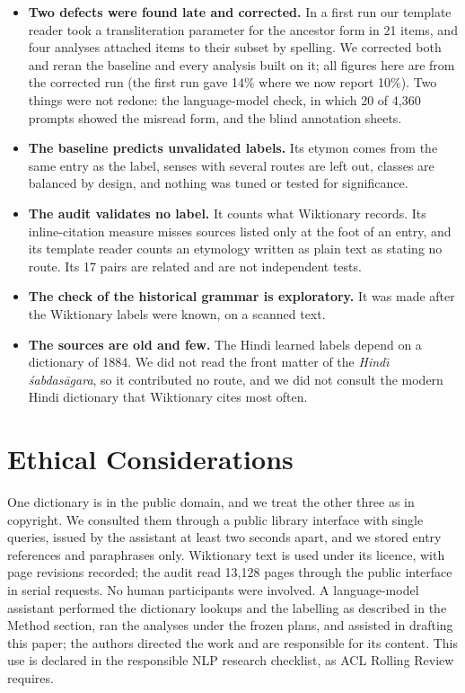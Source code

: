 \documentclass[11pt]{article}
\begin{document}
\begin{itemize}
\item \textbf{Two defects were found late and corrected.} In a first run our template reader took a transliteration parameter for the ancestor form in 21 items, and four analyses attached items to their subset by spelling. We corrected both and reran the baseline and every analysis built on it; all figures here are from the corrected run (the first run gave 14\% where we now report 10\%). Two things were not redone: the language-model check, in which 20 of 4,360 prompts showed the misread form, and the blind annotation sheets.
\item \textbf{The baseline predicts unvalidated labels.} Its etymon comes from the same entry as the label, senses with several routes are left out, classes are balanced by design, and nothing was tuned or tested for significance.
\item \textbf{The audit validates no label.} It counts what Wiktionary records. Its inline-citation measure misses sources listed only at the foot of an entry, and its template reader counts an etymology written as plain text as stating no route. Its 17 pairs are related and are not independent tests.
\item \textbf{The check of the historical grammar is exploratory.} It was made after the Wiktionary labels were known, on a scanned text.
\item \textbf{The sources are old and few.} The Hindi learned labels depend on a dictionary of 1884. We did not read the front matter of the \textit{Hind\=\i{} \'sabdas\=agara}, so it contributed no route, and we did not consult the modern Hindi dictionary that Wiktionary cites most often.
\end{itemize}

\section*{Ethical Considerations}

One dictionary is in the public domain, and we treat the other three as in copyright. We consulted them through a public library interface with single queries, issued by the assistant at least two seconds apart, and we stored entry references and paraphrases only. Wiktionary text is used under its licence, with page revisions recorded; the audit read 13,128 pages through the public interface in serial requests. No human participants were involved. A language-model assistant performed the dictionary lookups and the labelling as described in the Method section, ran the analyses under the frozen plans, and assisted in drafting this paper; the authors directed the work and are responsible for its content. This use is declared in the responsible NLP research checklist, as ACL Rolling Review requires.
\end{document}
